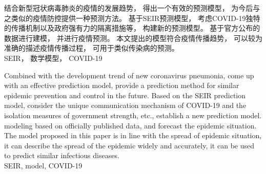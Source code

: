 \begin{cnabstract}
	结合新型冠状病毒肺炎的疫情的发展趋势，
	得出一个有效的预测模型，
	为今后与之类似的疫情防控提供一种预测方法。
	基于SEIR预测模型，
	考虑COVID-19独特的传播机制以及政府强有力的隔离措施等，
	构建新的预测模型。
	基于官方公布的数据进行建模，
	并进行疫情预测。
	本文提出的模型符合疫情传播趋势，
	可以较为准确的描述疫情传播过程，
	可用于类似传染病的预测。
	\\
	 SEIR， 数学模型， COVID-19
\end{cnabstract}
\begin{enabstract}
	Combined with the development trend of new coronavirus pneumonia,
	come up with an effective prediction model,
	provide a prediction method for similar epidemic prevention and control in the future.
	Based on the SEIR prediction model,
	consider the unique communication mechanism of COVID-19 and the isolation measures of government strength, etc.,
	establish a new prediction model.
	modeling based on officially published data,
	and forecast the epidemic situation.
	The model proposed in this paper is in line with the spread of epidemic situation,
	it can describe the spread of the epidemic widely and accurately,
	it can be used to predict similar infectious diseases.
	\\
	 SEIR, model, COVID-19
\end{enabstract}